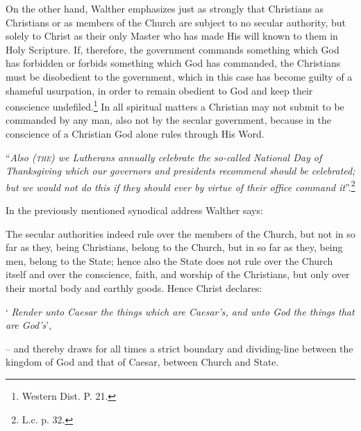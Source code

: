                 On the other hand, Walther emphasizes just as strongly that Christians as Christians or as members of the Church are subject to no secular authority, but solely to Christ as their only Master who has made His will known to them in Holy Scripture.  If, therefore, the government commands something which God has forbidden or forbids something which God has commanded, the Christians must be disobedient to the government, which in this case has become guilty of a shameful usurpation, in order to remain obedient to God and keep their conscience undefiled.\footnote{Western Dist. P. 21.}  In all spiritual matters a Christian may not submit to be commanded by any man, also not by the secular government, because in the conscience of a Christian God alone rules through His Word. \begin{displayquote}``\textit{Also {\scriptsize\textsc{(the)}} we Lutherans annually celebrate the so-called National Day of Thanksgiving which our governors and presidents recommend should be celebrated; but we would not do this if they should ever by virtue of their office command it}”.\footnote{L.c. p. 32.}\end{displayquote} In the previously mentioned synodical address Walther says: \begin{fancyquotes}The secular authorities indeed rule over the members of the Church, but not in so far as they, being Christians, belong to the Church, but in so far as they, being men, belong to the State; hence also the State does not rule over the Church itself and over the conscience, faith, and worship of the Christians, but only over their mortal body and earthly goods.  Hence Christ declares: \begin{displayquote}‘ \textit{Render unto Caesar the things which are Caesar’s, and unto God the things that are God’s}',\end{displayquote} -- and thereby draws for all times a strict boundary and dividing-line between the kingdom of God and that of Caesar, between Church and State.\end{fancyquotes}

